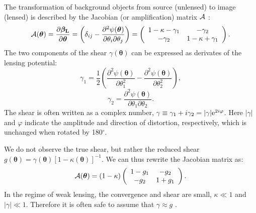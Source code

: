 The transformation of background objects from source (unlensed) to image (lensed) is described by the Jacobian (or amplification) matrix $\cal{A}$ \citep{DodelsonText}: 
\begin{equation}
\label{eqn:A}
{\cal A}(\bm{\theta}) = \frac{\partial \bm{\beta_{\rm L}}}{\partial \bm{\theta}}  = \left( \delta_{ij} - \frac{\partial^2 \psi(\bm{\theta})}{\partial \theta_{i} \partial \theta_j} \right) = \left( \begin{array}{cc}
{1-\kappa-\gamma_1} & {-\gamma_2} \\
{-\gamma_2} & {1-\kappa+\gamma_1} \\
\end{array} \right). 
\end{equation}
The two components of the shear $\gamma (\bm{\theta})$ can be expressed as derivates of the lensing potential:
\begin{equation}
\gamma_1 = \frac{1}{2} \left( \frac{\partial^2 \psi(\bm{\theta})}{\partial\theta_1^2} - \frac{\partial^2 \psi(\bm{\theta})}{\partial\theta_2^2} \right), 
\end{equation}
\begin{equation}
\gamma_2 = \frac{\partial^2 \psi(\bm{\theta})}{\partial\theta_1 \partial\theta_2}.
\end{equation}
The shear is often written as a complex number, $\gamma \equiv \gamma_1 + i\gamma_2 = |\gamma|{\rm e}^{2i\varphi}$. Here $|\gamma|$ and $\varphi$ indicate the amplitude and direction of distortion, respectively, which is unchanged when rotated by 180$^\circ$. 

We do not observe the true shear, but rather the reduced shear  $g(\bm{\theta}) = \gamma (\bm{\theta}) \left[1-\kappa (\bm{\theta}) \right]^{-1}$. We can thus rewrite the Jacobian matrix as:
\begin{equation}
\label{eqn:Ag}
{\cal A}(\bm{\theta}) = (1-\kappa) \left( \begin{array}{cc}
{1-g_1} & {-g_2} \\
{-g_2} & {1+g_1} \\
\end{array} \right). 
\end{equation}
In the regime of weak lensing, the convergence and shear are small, $\kappa \ll 1$ and $| \gamma| \ll 1$. Therefore it is often safe to assume that $\gamma \approx g$ \citep{Schneider06_WeakGravLens}.

